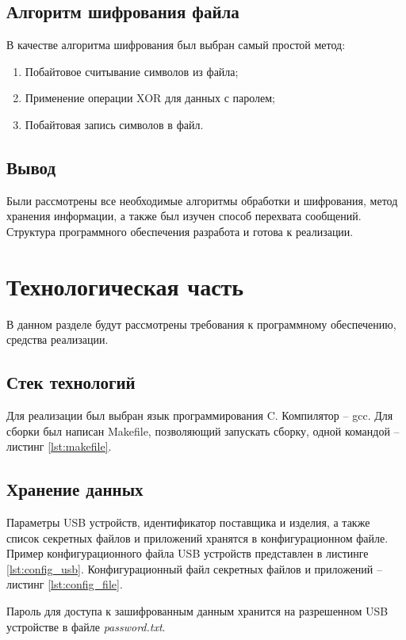 \documentclass[a4paper, 10pt]{article}
\begin{document}
	\subsection{Алгоритм шифрования файла}
	В качестве алгоритма шифрования был выбран самый простой метод:
	\begin{enumerate}
		\item Побайтовое считывание символов из файла;
		\item Применение операции XOR для данных с паролем;
		\item Побайтовая запись символов в файл.
	\end{enumerate}
	\subsection{Вывод}	 
	\hspace*{5mm}Были рассмотрены все необходимые алгоритмы обработки и шифрования, метод хранения информации,  а также был изучен способ перехвата сообщений. Структура программного обеспечения разработа и готова к реализации.
\clearpage
\newpage
\section{Технологическая часть}
	\hspace*{5mm} В данном разделе будут рассмотрены требования к программному обеспечению, средства реализации.
	\subsection{Стек технологий}
	\hspace*{5mm}Для реализации был выбран язык программирования C. Компилятор -- gcc. Для сборки был написан Makefile, позволяющий запускать сборку, одной командой -- листинг \ref{lst:makefile}.  
	\subsection{Хранение данных}
	\hspace*{5mm}Параметры USB устройств, идентификатор поставщика и изделия, а также список секретных файлов и приложений хранятся в конфигурационном файле. Пример конфигурационного файла USB устройств представлен в листинге \ref{lst:config_usb}. Конфигурационный файл секретных файлов и приложений -- листинг \ref{lst:config_file}.
	
	\hspace*{5mm}Пароль для доступа к зашифрованным данным хранится на разрешенном USB устройстве в файле \textit{password.txt}.
\end{document}
